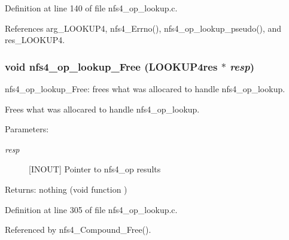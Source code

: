 Definition at line 140 of file nfs4\_\-op\_\-lookup.c.

References arg\_\-LOOKUP4, nfs4\_\-Errno(), nfs4\_\-op\_\-lookup\_\-pseudo(), and res\_\-LOOKUP4.
\subsubsection{\setlength{\rightskip}{0pt plus 5cm}void nfs4\_\-op\_\-lookup\_\-Free (LOOKUP4res $\ast$ {\em resp})}\label{nfs4__op__lookup_8c_a3}


nfs4\_\-op\_\-lookup\_\-Free: frees what was allocared to handle nfs4\_\-op\_\-lookup.

Frees what was allocared to handle nfs4\_\-op\_\-lookup.

\begin{Desc}
\item[Parameters:]
\begin{description}
\item[{\em resp}][INOUT] Pointer to nfs4\_\-op results\end{description}
\end{Desc}
\begin{Desc}
\item[Returns:]nothing (void function ) \end{Desc}


Definition at line 305 of file nfs4\_\-op\_\-lookup.c.

Referenced by nfs4\_\-Compound\_\-Free().